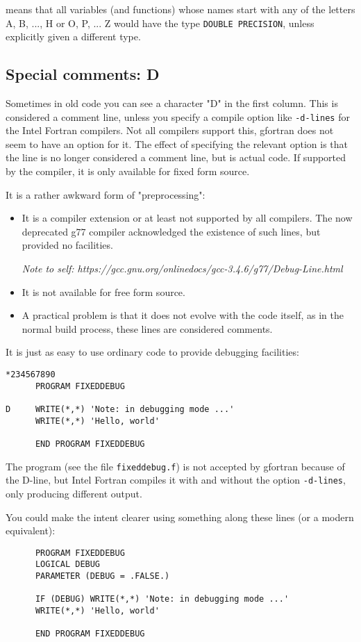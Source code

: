 \noindent means that all variables (and functions) whose names start with any of the letters A, B, ..., H or
O, P, ... Z would have the type \verb+DOUBLE PRECISION+, unless explicitly given a different type.

\subsection{Special comments: D}
Sometimes in old code you can see a character "D" in the first column. This is considered a comment line,
unless you specify a compile option like \verb+-d-lines+ for the Intel Fortran compilers. Not all compilers
support this, gfortran does not seem to have an option for it. The effect of specifying the relevant
option is that the line is no longer considered a comment line, but is actual code. If supported by the compiler,
it is only available for fixed form source.

It is a rather awkward form of "preprocessing":
\begin{itemize}
\item
It is a compiler extension or at least not supported by all compilers. The now deprecated g77 compiler acknowledged
the existence of such lines, but provided no facilities.

\emph{Note to self: https://gcc.gnu.org/onlinedocs/gcc-3.4.6/g77/Debug-Line.html
}
\item
It is not available for free form source.
\item
A practical problem is that it does not evolve with the code itself, as in the normal build process, these
lines are considered comments.
\end{itemize}

It is just as easy to use ordinary code to provide debugging facilities:
\begin{verbatim}
*234567890
      PROGRAM FIXEDDEBUG

D     WRITE(*,*) 'Note: in debugging mode ...'
      WRITE(*,*) 'Hello, world'

      END PROGRAM FIXEDDEBUG
\end{verbatim}

The program (see the file \verb+fixeddebug.f+) is not accepted by gfortran because of the D-line, but Intel Fortran
compiles it with and without the option \verb+-d-lines+, only producing different output.

You could make the intent clearer using something along these lines (or a modern equivalent):
\begin{verbatim}
      PROGRAM FIXEDDEBUG
      LOGICAL DEBUG
      PARAMETER (DEBUG = .FALSE.)

      IF (DEBUG) WRITE(*,*) 'Note: in debugging mode ...'
      WRITE(*,*) 'Hello, world'

      END PROGRAM FIXEDDEBUG
\end{verbatim}

